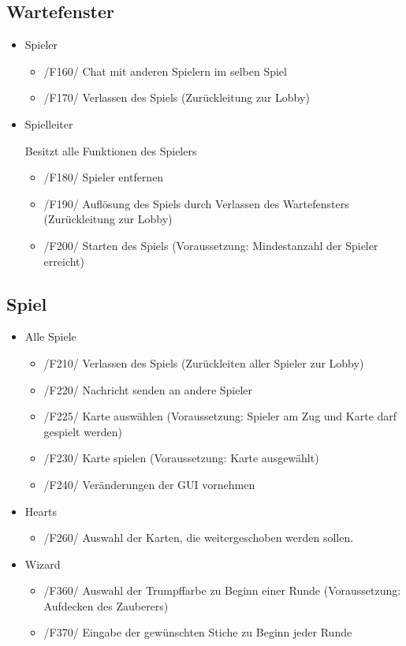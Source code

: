 \documentclass{article}
\begin{document}
\subsection{\gls{Wartefenster}}
\begin{itemize}
	\item Spieler
	\begin{itemize}
		\item /F160/ Chat mit anderen Spielern im selben Spiel
		\item /F170/ Verlassen des Spiels (Zurückleitung zur \gls{Lobby})
	\end{itemize}
	\item \gls{Spielleiter}
	
	Besitzt alle Funktionen des Spielers
	\begin{itemize}
		\item /F180/ Spieler entfernen
		\item /F190/ Auflösung des Spiels durch Verlassen des \gls{Wartefenster}s (Zurückleitung zur \gls{Lobby})
		\item /F200/ Starten des Spiels (Voraussetzung: Mindestanzahl der Spieler erreicht)
	\end{itemize}
\end{itemize}

\subsection{Spiel}
\begin{itemize}
	\item Alle Spiele
	\begin{itemize}
		\item /F210/ Verlassen des Spiels (Zurückleiten aller Spieler zur \gls{Lobby})
		\item /F220/ Nachricht senden an andere Spieler
		\item /F225/ Karte auswählen (Voraussetzung: Spieler am Zug und Karte darf gespielt werden)
		\item /F230/ Karte spielen (Voraussetzung: Karte ausgewählt)
		\item /F240/ Veränderungen der GUI vornehmen
	\end{itemize}
	\item Hearts
	\begin{itemize}
		\item /F260/ Auswahl der Karten, die weitergeschoben werden sollen.
	\end{itemize}
	\item Wizard
	\begin{itemize}
		\item /F360/ Auswahl der Trumpffarbe zu Beginn einer Runde (Voraussetzung: Aufdecken des Zauberers)
		\item /F370/ Eingabe der gewünschten Stiche zu Beginn jeder Runde
	\end{itemize}
\end{itemize}
\end{document}
